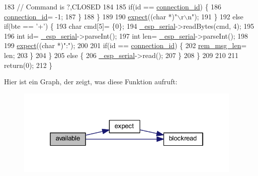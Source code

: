 \begin{DoxyCode}
183         \textcolor{comment}{// Command is ?,CLOSED}
184 
185         \textcolor{keywordflow}{if}(\textcolor{keywordtype}{id} == \hyperlink{class_esp_server_a821bd4e05f0b260cc584a2d23bda0fff}{connection\_id}) \{
186           \hyperlink{class_esp_server_a821bd4e05f0b260cc584a2d23bda0fff}{connection\_id}= -1;
187         \}
188       \}
189 
190       \hyperlink{class_esp_server_aff5ea67ab96af075223b2b836036ccf1}{expect}((\textcolor{keywordtype}{char} *)\textcolor{stringliteral}{"\(\backslash\)r\(\backslash\)n"});
191     \}
192     \textcolor{keywordflow}{else} \textcolor{keywordflow}{if}(bte == \textcolor{charliteral}{'+'}) \{
193       \textcolor{keywordtype}{char} cmd[5]= \{0\};
194       \hyperlink{class_esp_server_a552aab874ad99b696f4c997d6f5a4746}{\_esp\_serial}->readBytes(cmd, 4);
195 
196       \textcolor{keywordtype}{int} \textcolor{keywordtype}{id}= \hyperlink{class_esp_server_a552aab874ad99b696f4c997d6f5a4746}{\_esp\_serial}->parseInt();
197       \textcolor{keywordtype}{int} len= \hyperlink{class_esp_server_a552aab874ad99b696f4c997d6f5a4746}{\_esp\_serial}->parseInt();
198 
199       \hyperlink{class_esp_server_aff5ea67ab96af075223b2b836036ccf1}{expect}((\textcolor{keywordtype}{char} *)\textcolor{stringliteral}{":"});
200 
201       \textcolor{keywordflow}{if}(\textcolor{keywordtype}{id} == \hyperlink{class_esp_server_a821bd4e05f0b260cc584a2d23bda0fff}{connection\_id}) \{
202         \hyperlink{class_esp_server_a34a62d83c82a13f441af983f9b212e25}{rem\_msg\_len}= len;
203       \}
204     \}
205     \textcolor{keywordflow}{else} \{
206       \hyperlink{class_esp_server_a552aab874ad99b696f4c997d6f5a4746}{\_esp\_serial}->read();
207     \}
208   \}
209 
210 
211   \textcolor{keywordflow}{return}(0);
212 \}
\end{DoxyCode}
Hier ist ein Graph, der zeigt, was diese Funktion aufruft\+:\nopagebreak
\begin{figure}[H]
\begin{center}
\leavevmode
\includegraphics[width=310pt]{class_esp_server_a4549a76725f2e4c013e4d57018366109_cgraph}
\end{center}
\end{figure}
